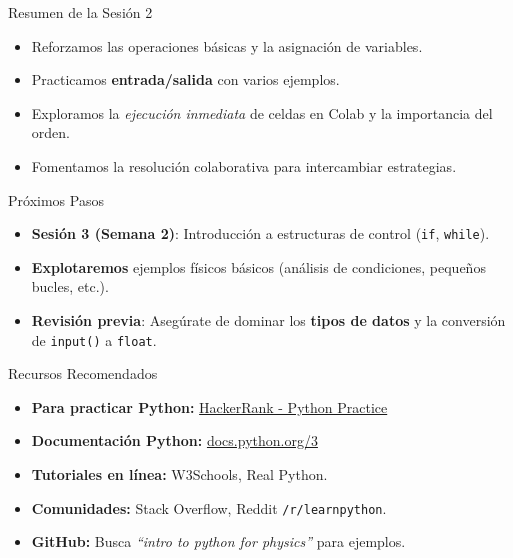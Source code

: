 \documentclass[10pt]{beamer}
\begin{document}
\begin{frame}{Resumen de la Sesión 2}
  \begin{itemize}
    \item Reforzamos las operaciones básicas y la asignación de variables.
    \item Practicamos \textbf{entrada/salida} con varios ejemplos.
    \item Exploramos la \textit{ejecución inmediata} de celdas en Colab y la importancia del orden.
    \item Fomentamos la resolución colaborativa para intercambiar estrategias.
  \end{itemize}
\end{frame}

\begin{frame}{Próximos Pasos}
  \begin{itemize}
    \item \textbf{Sesión 3 (Semana 2)}: Introducción a estructuras de control (\texttt{if}, \texttt{while}).
    \item \textbf{Explotaremos} ejemplos físicos básicos (análisis de condiciones, pequeños bucles, etc.).
    \item \textbf{Revisión previa}: Asegúrate de dominar los \textbf{tipos de datos} y la conversión de \texttt{input()} a \texttt{float}.
  \end{itemize}
\end{frame}

\begin{frame}{Recursos Recomendados}
  \begin{itemize}
    \item \textbf{Para practicar Python:} \href{https://www.hackerrank.com/domains/python?filters\%5Bdifficulty\%5D\%5B\%5D=easy}{HackerRank - Python Practice}
    \item \textbf{Documentación Python:} \href{https://docs.python.org/3/}{docs.python.org/3}
    \item \textbf{Tutoriales en línea:} W3Schools, Real Python.
    \item \textbf{Comunidades:} Stack Overflow, Reddit \texttt{/r/learnpython}.
    \item \textbf{GitHub:} Busca \emph{“intro to python for physics”} para ejemplos.
  \end{itemize}
\end{frame}
\end{document}
